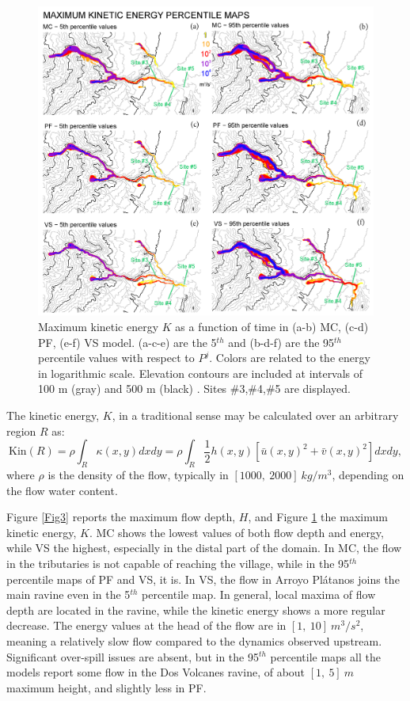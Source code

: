 \documentclass[nhess, manuscript]{copernicus}
\begin{document}
\begin{figure}[H]
\centering
\includegraphics[width=1\textwidth]{Fig4.png}
\caption{Maximum kinetic energy $K$ as a function of time in (a-b) MC, (c-d) PF, (e-f) VS model. (a-c-e) are the 5$^{th}$ and (b-d-f) are the 95$^{th}$ percentile values with respect to $P^j$. Colors are related to the energy in logarithmic scale. Elevation contours are included at intervals of 100 m (gray) and 500 m (black) \citep{NASA2014}. Sites \#3,\#4,\#5 are displayed.}
\label{Fig4}
\end{figure}
The kinetic energy, $K$, in a traditional sense may be calculated over an arbitrary region $R$ as:
$$\textrm{Kin}(R)=\rho\int_R \kappa(x,y) dx dy=\rho\int_R \frac{1}{2} h(x,y)\left[\bar{u}(x,y)^2+\bar{v}(x,y)^2\right] dx dy,$$
where $\rho$ is the density of the flow, typically in $[1000,\ 2000]\ kg/m^3$, depending on the flow water content.

Figure \ref{Fig3} reports the maximum flow depth, $H$, and Figure \ref{Fig4} the maximum kinetic energy, $K$. MC shows the lowest values of both flow depth and energy, while VS the highest, especially in the distal part of the domain. In MC, the flow in the tributaries is not capable of reaching the village, while in the 95$^{th}$ percentile maps of PF and VS, it is. In VS, the flow in Arroyo Pl\'atanos joins the main ravine even in the 5$^{th}$ percentile map. In general, local maxima of flow depth are located in the ravine, while the kinetic energy shows a more regular decrease. The energy values at the head of the flow are in $[1,\ 10]\  m^3/s^2$, meaning a relatively slow flow compared to the dynamics observed upstream. Significant over-spill issues are absent, but in the 95$^{th}$ percentile maps all the models report some flow in the Dos Volcanes ravine, of about $[1,\ 5]\ m$ maximum height, and slightly less in PF.
\end{document}
